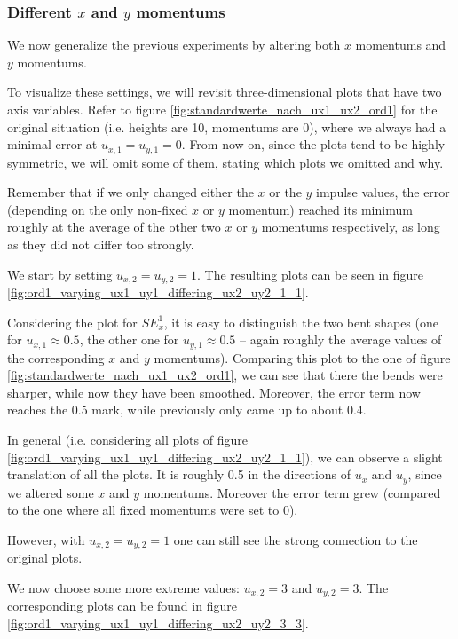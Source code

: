 \documentclass{article}
\begin{document}
\subsubsection{\texorpdfstring{Different $x$ and $y$ momentums}{Different x and y momentums}}
\label{sec:stiffness-analysis-different-ux-uy-momentums}

We now generalize the previous experiments by altering both $x$ momentums and $y$ momentums.



To visualize these settings, we will revisit three-dimensional plots that have two axis variables. Refer to figure \ref{fig:standardwerte_nach_ux1_ux2_ord1} for the original situation (i.e. heights are 10, momentums are 0), where we always had a minimal error at $u_{x,1}=u_{y,1}=0$. From now on, since the plots tend to be highly symmetric, we will omit some of them, stating which plots we omitted and why.

Remember that if we only changed either the $x$ or the $y$ impulse values, the error (depending on the only non-fixed $x$ or $y$ momentum) reached its minimum roughly at the average of the other two $x$ or $y$ momentums respectively, as long as they did not differ too strongly.

We start by setting $u_{x,2}=u_{y,2}=1$. The resulting plots can be seen in figure \ref{fig:ord1_varying_ux1_uy1_differing_ux2_uy2_1_1}.

Considering the plot for $SE_x^1$, it is easy to distinguish the two bent shapes (one for $u_{x,1}\approx 0.5$, the other one for $u_{y,1}\approx 0.5$ -- again roughly the average values of the corresponding $x$ and $y$ momentums). Comparing this plot to the one of figure \ref{fig:standardwerte_nach_ux1_ux2_ord1}, we can see that there the bends were sharper, while now they have been smoothed. Moreover, the error term now reaches the 0.5 mark, while previously only came up to about 0.4.

In general (i.e. considering all plots of figure \ref{fig:ord1_varying_ux1_uy1_differing_ux2_uy2_1_1}), we can observe a slight translation of all the plots. It is roughly 0.5 in the directions of $u_x$ and $u_y$, since we altered some $x$ and $y$ momentums. Moreover the error term grew (compared to the one where all fixed momentums were set to 0).

However, with $u_{x,2}=u_{y,2}=1$ one can still see the strong connection to the original plots.

We now choose some more extreme values: $u_{x,2}=3$ and $u_{y,2}=3$. The corresponding plots can be found in figure \ref{fig:ord1_varying_ux1_uy1_differing_ux2_uy2_3_3}.
\end{document}
